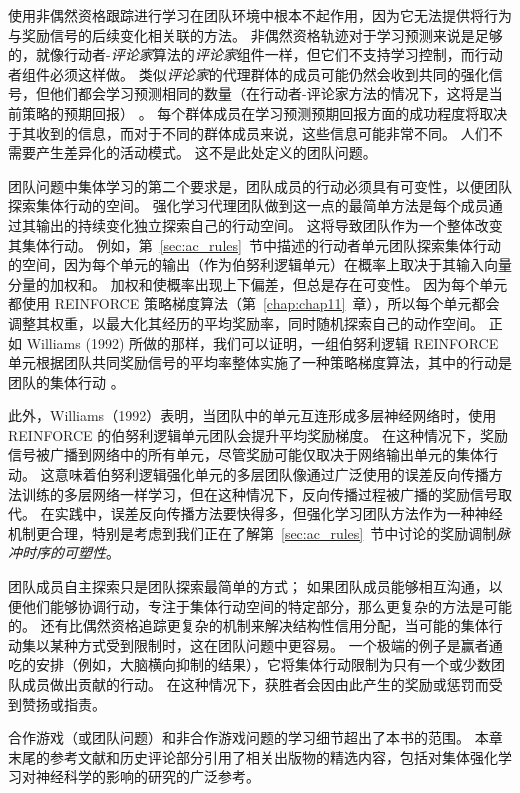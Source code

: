 使用非偶然资格跟踪进行学习在团队环境中根本不起作用，因为它无法提供将行为与奖励信号的后续变化相关联的方法。
非偶然资格轨迹对于学习预测来说是足够的，就像行动者-\textit{评论家}算法的\textit{评论家}组件一样，但它们不支持学习控制，而行动者组件必须这样做。
类似\textit{评论家}的代理群体的成员可能仍然会收到共同的强化信号，但他们都会学习预测相同的数量（在行动者-评论家方法的情况下，这将是当前策略的预期回报） 。
每个群体成员在学习预测预期回报方面的成功程度将取决于其收到的信息，而对于不同的群体成员来说，这些信息可能非常不同。
人们不需要产生差异化的活动模式。
这不是此处定义的团队问题。


团队问题中集体学习的第二个要求是，团队成员的行动必须具有可变性，以便团队探索集体行动的空间。
强化学习代理团队做到这一点的最简单方法是每个成员通过其输出的持续变化独立探索自己的行动空间。
这将导致团队作为一个整体改变其集体行动。
例如，第~\ref{sec:ac_rules}~节中描述的行动者单元团队探索集体行动的空间，因为每个单元的输出（作为伯努利逻辑单元）在概率上取决于其输入向量分量的加权和。
加权和使概率出现上下偏差，但总是存在可变性。
因为每个单元都使用 REINFORCE 策略梯度算法（第~\ref{chap:chap11}~章），所以每个单元都会调整其权重，以最大化其经历的平均奖励率，同时随机探索自己的动作空间。
正如 Williams (1992) 所做的那样，我们可以证明，一组伯努利逻辑 REINFORCE 单元根据团队共同奖励信号的平均率整体实施了一种策略梯度算法，其中的行动是团队的集体行动 。


此外，Williams（1992）表明，当团队中的单元互连形成多层神经网络时，使用 REINFORCE 的伯努利逻辑单元团队会提升平均奖励梯度。
在这种情况下，奖励信号被广播到网络中的所有单元，尽管奖励可能仅取决于网络输出单元的集体行动。
这意味着伯努利逻辑强化单元的多层团队像通过广泛使用的误差反向传播方法训练的多层网络一样学习，但在这种情况下，反向传播过程被广播的奖励信号取代。
在实践中，误差反向传播方法要快得多，但强化学习团队方法作为一种神经机制更合理，特别是考虑到我们正在了解第~\ref{sec:ac_rules}~节中讨论的奖励调制\textit{脉冲时序的可塑性}。


团队成员自主探索只是团队探索最简单的方式；
如果团队成员能够相互沟通，以便他们能够协调行动，专注于集体行动空间的特定部分，那么更复杂的方法是可能的。
还有比偶然资格追踪更复杂的机制来解决结构性信用分配，当可能的集体行动集以某种方式受到限制时，这在团队问题中更容易。
一个极端的例子是赢者通吃的安排（例如，大脑横向抑制的结果），它将集体行动限制为只有一个或少数团队成员做出贡献的行动。
在这种情况下，获胜者会因由此产生的奖励或惩罚而受到赞扬或指责。


合作游戏（或团队问题）和非合作游戏问题的学习细节超出了本书的范围。
本章末尾的参考文献和历史评论部分引用了相关出版物的精选内容，包括对集体强化学习对神经科学的影响的研究的广泛参考。


